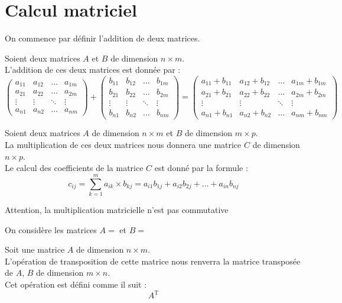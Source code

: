 \section{Calcul matriciel}
On commence par définir l'addition de deux matrices.
\begin{defi}
Soient deux matrices $A$ et $B$ de dimension $n\times m$.\\
L'addition de ces deux matrices est donnée par :
$$\begin{pmatrix}a_{11} & a_{12} & \hdots & a_{1m}\\a_{21} & a_{22} & \hdots & a_{2m}\\ \vdots & \vdots & \ddots & \vdots\\ a_{n1} & a_{n2} & \hdots & a_{nm} \end{pmatrix}+\begin{pmatrix}b_{11} & b_{12} & \hdots & b_{1m}\\b_{21} & b_{22} & \hdots & b_{2m}\\ \vdots & \vdots & \ddots & \vdots\\ b_{n1} & b_{n2} & \hdots & b_{nm} \end{pmatrix}=\begin{pmatrix}a_{11}+b_{11} & a_{12}+b_{12} & \hdots & a_{1m}+b_{1m}\\a_{21}+b_{21} & a_{22}+b_{22} & \hdots & a_{2m}+b_{2m}\\ \vdots & \vdots & \ddots & \vdots\\ a_{n1}+b_{n1} & a_{n2}+b_{n2} & \hdots & a_{nm}+b_{nm} \end{pmatrix}$$
\end{defi}
\begin{defi}
Soient deux matrices $A$ de dimension $n\times m$ et $B$ de dimension $m\times p$.\\
La multiplication de ces deux matrices nous donnera une matrice $C$ de dimension $n\times p$.\\
Le calcul des coefficients de la matrice $C$ est donné par la formule :
$$c_{ij}=\sum_{k=1}^m a_{ik}\times b_{kj}=a_{i1}b_{1j}+a_{i2}b_{2j}+\hdots+a_{in}b_{nj}$$
\end{defi}
Attention, la multiplication matricielle n'est pas commutative
\begin{ex}
On considère les matrices $A=$ et $B=$
\end{ex}
\begin{defi}
Soit une matrice $A$ de dimension $n\times m$.\\
L'opération de transposition de cette matrice nous renverra la matrice transposée de $A$, $B$ de dimension $m\times n$.\\
Cet opération est défini comme il suit :
$$A^\text{T}$$
\end{defi}
